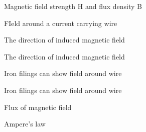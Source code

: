\documentclass[compress]{beamer}
\makeatletter
\let\beamer@writeslidentry@miniframeson=\beamer@writeslidentry
\def\beamer@writeslidentry@miniframesoff{%
  \expandafter\beamer@ifempty\expandafter{\beamer@framestartpage}{}%
  {%
    \clearpage\beamer@notesactions%
  }
}
\newcommand*{\miniframeson}{\let\beamer@writeslidentry=\beamer@writeslidentry@miniframeson}
\newcommand*{\miniframesoff}{\let\beamer@writeslidentry=\beamer@writeslidentry@miniframesoff}
\makeatother
\begin{document}
{
    \begin{frame}{Magnetic field strength H and flux density B}
    \end{frame}
}


{
    \begin{frame}{FIeld around a current carrying wire}
    \end{frame}
}


{
    \begin{frame}{The direction of induced magnetic field}
    \end{frame}
}


{
    \begin{frame}{The direction of induced magnetic field}
    \end{frame}
}


{
    \begin{frame}{Iron filings can show field around wire}
    \end{frame}
}

\miniframesoff
{
    \begin{frame}{Iron filings can show field around wire}
    \end{frame}
}
\miniframeson


{
    \begin{frame}{Flux of magnetic field}
    \end{frame}
}


{
    \begin{frame}{Ampere's law}
    \end{frame}
}
\end{document}
